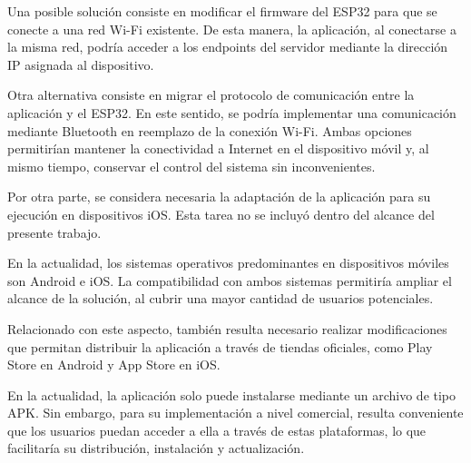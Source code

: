 Una posible solución consiste en modificar el firmware del ESP32 para
que se conecte a una red Wi-Fi existente. De esta manera, la aplicación,
al conectarse a la misma red, podría acceder a los endpoints
del servidor mediante la dirección IP asignada al dispositivo.

Otra alternativa consiste en migrar el protocolo de comunicación entre
la aplicación y el ESP32. En este sentido, se podría implementar una
comunicación mediante Bluetooth en reemplazo de la conexión Wi-Fi. Ambas
opciones permitirían mantener la conectividad a Internet en el
dispositivo móvil y, al mismo tiempo, conservar el control del sistema
sin inconvenientes.

Por otra parte, se considera necesaria la adaptación de la aplicación
para su ejecución en dispositivos iOS. Esta tarea no se incluyó dentro
del alcance del presente trabajo. 

En la actualidad, los sistemas
operativos predominantes en dispositivos móviles son Android e iOS. La compatibilidad con ambos sistemas permitiría ampliar el alcance de la solución, al cubrir una mayor cantidad de usuarios potenciales.

Relacionado con este aspecto, también resulta necesario realizar
modificaciones que permitan distribuir la aplicación a través de
tiendas oficiales, como Play Store en Android y App Store en iOS.

En la actualidad, la aplicación solo puede instalarse mediante un
archivo de tipo APK. Sin embargo, para su implementación a nivel
comercial, resulta conveniente que los usuarios puedan acceder a ella a
través de estas plataformas, lo que facilitaría su distribución,
instalación y actualización.